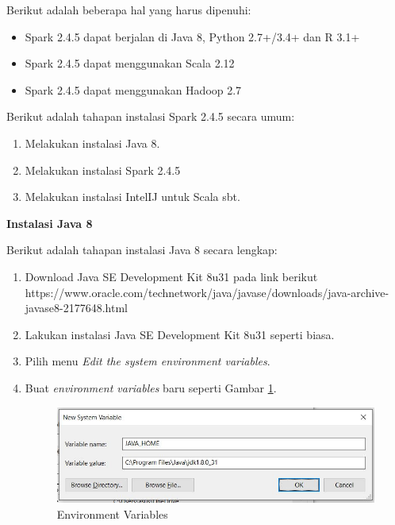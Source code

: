 \documentclass[a4paper,twoside]{article}
\begin{document}
\begin{enumerate}
\noindent Berikut adalah beberapa hal yang harus dipenuhi:

\begin{itemize}
\item Spark 2.4.5 dapat berjalan di Java 8, Python 2.7+/3.4+ dan R 3.1+ 
\item Spark 2.4.5 dapat menggunakan Scala 2.12
\item Spark 2.4.5 dapat menggunakan Hadoop 2.7
\end{itemize}

\noindent Berikut adalah tahapan instalasi Spark 2.4.5 secara umum:

\begin{enumerate}
\item Melakukan instalasi Java 8.
\item Melakukan instalasi Spark 2.4.5
\item Melakukan instalasi IntelIJ untuk Scala sbt.
\end{enumerate}

\textbf{Instalasi Java 8}

\noindent Berikut adalah tahapan instalasi Java 8 secara lengkap:

\begin{enumerate}

\item Download Java SE Development Kit 8u31 pada link berikut \\
\textsf{https://www.oracle.com/technetwork/java/javase/downloads/java-archive-javase8-2177648.html}
 
\item Lakukan instalasi Java SE Development Kit 8u31 seperti biasa.

\item Pilih menu \textit{Edit the system environment variables}.

\item Buat \textit{environment variables} baru seperti Gambar \ref{fig:instal_java_5}.

\begin{figure}[H]
	\centering
	\includegraphics[scale=0.85]{instal_java_5}
	\caption{Environment Variables}
	\label{fig:instal_java_5}
\end{figure}


\end{enumerate}
\end{enumerate}
\end{document}
